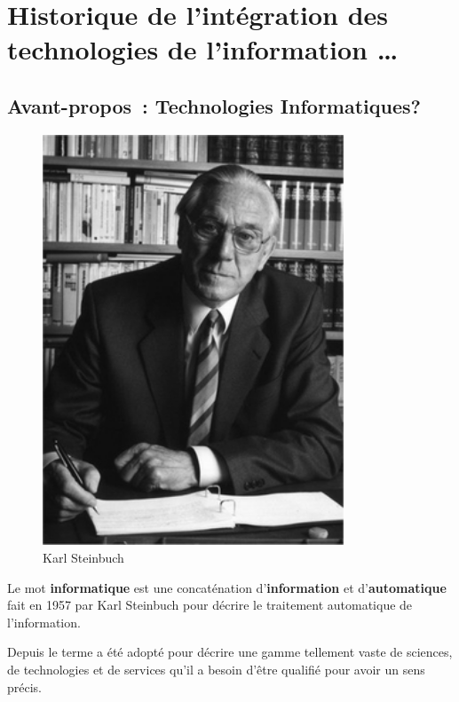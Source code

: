 
\part{Historique de l'intégration des technologies de l'information \ldots}\label{quoi}

\chapter*{Avant-propos~: Technologies Informatiques?}

\begin{minipage}[H]{0.3\linewidth}
  \begin{figure}[H]
  \centering
  \includegraphics[width=0.8\textwidth]{../resources/illustrations/steinbuch}
  \caption{Karl Steinbuch}
  \end{figure}
\end{minipage}
\begin{minipage}[H]{0.7\linewidth}
Le mot \textbf{informatique} est une concaténation d'\textbf{information} et d'\textbf{automatique} fait en 1957 par Karl Steinbuch\cite{steinbuch-2005} pour décrire le traitement automatique de l'information.

Depuis le terme a été adopté pour décrire une gamme tellement vaste de sciences, de technologies et de services qu'il a besoin d'être qualifié pour avoir un sens précis.
\vspace{1cm}
\end{minipage}

